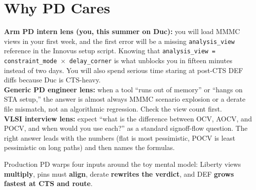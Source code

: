 \section{Why PD Cares}

\begin{pdnote}
\textbf{Arm PD intern lens (you, this summer on Duc):} you will load MMMC views in your first week, and the first error will be a missing \texttt{analysis\_view} reference in the Innovus setup script. Knowing that \texttt{analysis\_view = constraint\_mode $\times$ delay\_corner} is what unblocks you in fifteen minutes instead of two days. You will also spend serious time staring at post-CTS DEF diffs because Duc is CTS-heavy.\\
\textbf{Generic PD engineer lens:} when a tool ``runs out of memory'' or ``hangs on STA setup,'' the answer is almost always MMMC scenario explosion or a derate file mismatch, not an algorithmic regression. Check the view count first.\\
\textbf{VLSI interview lens:} expect ``what is the difference between OCV, AOCV, and POCV, and when would you use each?'' as a standard signoff-flow question. The right answer leads with the numbers (flat is most pessimistic, POCV is least pessimistic on long paths) and then names the formulas.
\end{pdnote}

\begin{checkpoint}
Production PD warps four inputs around the toy mental model: Liberty views \textbf{multiply}, pins must \textbf{align}, derate \textbf{rewrites the verdict}, and DEF \textbf{grows fastest at CTS and route}.
\end{checkpoint}
